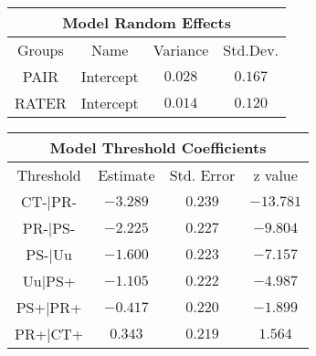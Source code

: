 \newline
\newline
\newline
\begin{minipage}{\linewidth}
\begin{tabular}{|c|c|c|c|}
\hline
\multicolumn{4}{|c|}{Model Random Effects}\\\hline
Groups  &  Name       &  Variance & Std.Dev.\\\hline
PAIR  & Intercept & $0.028$   & $0.167$  \\\hline
RATER & Intercept & $0.014$   & $0.120$ \\\hline
\end{tabular}
\end{minipage}
\newline
\newline
\newline
\begin{minipage}{\linewidth}
\begin{tabular}{|c|c|c|c|}
\hline
\multicolumn{4}{|c|}{Model Threshold Coefficients}\\\hline
Threshold &  Estimate & Std. Error & z value\\\hline
CT-|PR- & $-3.289$ & $0.239$ & $-13.781$\\\hline
PR-|PS- & $-2.225$ & $0.227$ & $ -9.804$\\\hline
PS-|Uu  & $-1.600$ & $0.223$ & $ -7.157$\\\hline
Uu|PS+  & $-1.105$ & $0.222$ & $ -4.987$\\\hline
PS+|PR+ & $-0.417$ & $0.220$ & $ -1.899$\\\hline
PR+|CT+ & $ 0.343$ & $0.219$ & $  1.564$\\\hline
\end{tabular}
\end{minipage}
